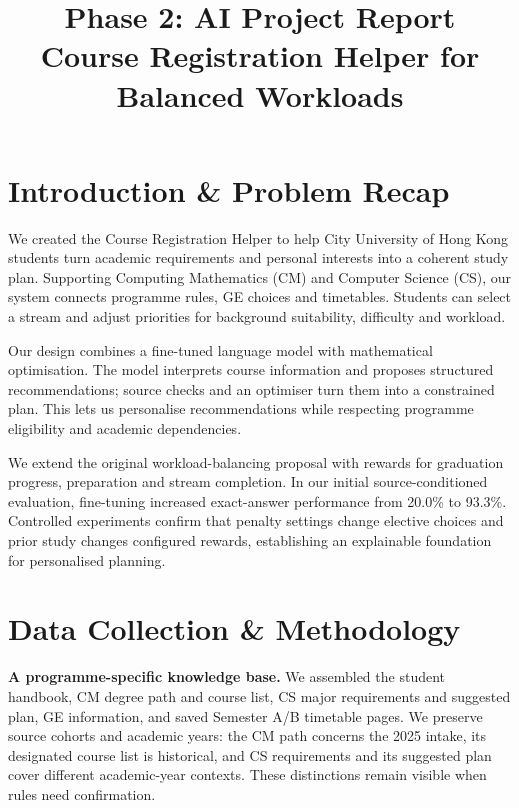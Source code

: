 \documentclass{article}
\title{Phase 2: AI Project Report\\
\large Course Registration Helper for Balanced Workloads}
\author{}
\begin{document}
\maketitle

\section{Introduction \& Problem Recap}
We created the Course Registration Helper to help City University of Hong Kong students turn academic requirements and personal interests into a coherent study plan. Supporting Computing Mathematics (CM) and Computer Science (CS), our system connects programme rules, GE choices and timetables. Students can select a stream and adjust priorities for background suitability, difficulty and workload.

Our design combines a fine-tuned language model with mathematical optimisation. The model interprets course information and proposes structured recommendations; source checks and an optimiser turn them into a constrained plan. This lets us personalise recommendations while respecting programme eligibility and academic dependencies.

We extend the original workload-balancing proposal with rewards for graduation progress, preparation and stream completion. In our initial source-conditioned evaluation, fine-tuning increased exact-answer performance from 20.0\% to 93.3\%. Controlled experiments confirm that penalty settings change elective choices and prior study changes configured rewards, establishing an explainable foundation for personalised planning.

\section{Data Collection \& Methodology}
\textbf{A programme-specific knowledge base.} We assembled the student handbook, CM degree path and course list, CS major requirements and suggested plan, GE information, and saved Semester A/B timetable pages\citep{cityu-programmes}. We preserve source cohorts and academic years: the CM path concerns the 2025 intake, its designated course list is historical, and CS requirements and its suggested plan cover different academic-year contexts. These distinctions remain visible when rules need confirmation.
\end{document}

